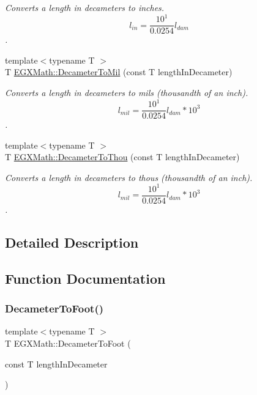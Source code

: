 \begin{DoxyCompactItemize}
\begin{DoxyCompactList}\small\item\em Converts a length in decameters to inches. \[ l_{in}= \frac{10^{1}}{0.0254} l_{dam} \]. \end{DoxyCompactList}\item 
{\footnotesize template$<$typename T $>$ }\\T \mbox{\hyperlink{group___e_g_x_math-_conversions-_length_conversions-_s_i-_decameter-_imperial_gaee77251b6c2f2e8e0feae0032e80e0c3}{E\+G\+X\+Math\+::\+Decameter\+To\+Mil}} (const T length\+In\+Decameter)
\begin{DoxyCompactList}\small\item\em Converts a length in decameters to mils (thousandth of an inch). \[ l_{mil}= \frac{10^{1}}{0.0254} l_{dam} * 10^{3} \]. \end{DoxyCompactList}\item 
{\footnotesize template$<$typename T $>$ }\\T \mbox{\hyperlink{group___e_g_x_math-_conversions-_length_conversions-_s_i-_decameter-_imperial_ga4f21f4b1df62d1d63f46849c4f38d56b}{E\+G\+X\+Math\+::\+Decameter\+To\+Thou}} (const T length\+In\+Decameter)
\begin{DoxyCompactList}\small\item\em Converts a length in decameters to thous (thousandth of an inch). \[ l_{mil}= \frac{10^{1}}{0.0254} l_{dam} * 10^{3} \]. \end{DoxyCompactList}\end{DoxyCompactItemize}


\subsection{Detailed Description}


\subsection{Function Documentation}
\mbox{\label{group___e_g_x_math-_conversions-_length_conversions-_s_i-_decameter-_imperial_gad2829e03e1755db4f7f9b21070ecaef6}} 
\subsubsection{\texorpdfstring{Decameter\+To\+Foot()}{DecameterToFoot()}}
{\footnotesize\ttfamily template$<$typename T $>$ \\
T E\+G\+X\+Math\+::\+Decameter\+To\+Foot (\begin{DoxyParamCaption}\item[{const T}]{length\+In\+Decameter }\end{DoxyParamCaption})}




